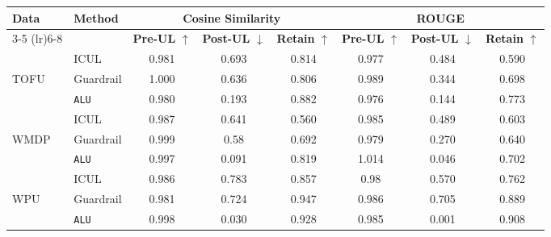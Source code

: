 \begin{table*}[]
    \centering
    \caption{Comparison of Methods using Cosine Similarity and ROUGE Metrics with Qwen2.5-7B-Instruct}
    \begin{tabular}{llccc|ccc}
        \toprule
        \textbf{Data}&\textbf{Method} & \multicolumn{3}{c}{\textbf{Cosine Similarity}} & \multicolumn{3}{c}{\textbf{ROUGE}} \\
        \cmidrule(lr){3-5} \cmidrule(lr){6-8}
         & & \textbf{Pre-UL} $\uparrow$ & \textbf{Post-UL} $\downarrow$ & \textbf{Retain} $\uparrow$ & \textbf{Pre-UL} $\uparrow$ & \textbf{Post-UL} $\downarrow$ & \textbf{Retain} $\uparrow$ \\
        \midrule
        &ICUL & 0.981 & 0.693 & 0.814 & 0.977 & 0.484 & 0.590 \\
        TOFU &Guardrail & 1.000 & 0.636 & 0.806 & 0.989 & 0.344 & 0.698 \\
        &\texttt{ALU}  & 0.980 & 0.193 & 0.882 & 0.976 & 0.144 & 0.773 \\
        \midrule
        &ICUL  & 0.987 & 0.641 & 0.560 & 0.985 & 0.489 & 0.603 \\
        WMDP & Guardrail  & 0.999 & 0.58 & 0.692 & 0.979 & 0.270 & 0.640 \\
        &\texttt{ALU} & 0.997 & 0.091 & 0.819 & 1.014 & 0.046 & 0.702 \\
        \midrule
        &ICUL  & 0.986 & 0.783 & 0.857 & 0.98 & 0.570 & 0.762 \\
        WPU &Guardrail & 0.981 & 0.724 & 0.947 & 0.986 & 0.705 & 0.889 \\
        &\texttt{ALU} & 0.998 & 0.030 & 0.928 & 0.985 & 0.001 & 0.908 \\
        
        \bottomrule
    \end{tabular}
\label{tab:t28}    
\end{table*}

